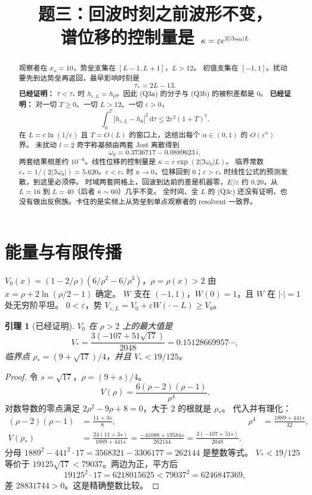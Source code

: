 \documentclass[11pt]{ctexart}
\title{题三：回波时刻之前波形不变，\\
谱位移的控制量是 $\kappa=\eps e^{2|\Im\omega_0|L}$}
\author{}
\date{}
\newtheorem{lemma}[theorem]{引理}
\theoremstyle{definition}
\theoremstyle{remark}
\newcommand{\eps}{\varepsilon}
\newcommand{\rd}{\mathrm{d}}
\begin{document}
\pagestyle{plain}
\maketitle

\begin{abstract}
观察者在 $x_o=10$，势垒支集在 $[L-1,L+1]$，$L>12$。
初值支集在 $[-1,1]$。扰动要先到达势垒再返回，最早影响时刻是
\[
\tau_*=2L-13.
\]
\textbf{已经证明：} $\tau<\tau_*$ 时 $h_{\eps,L}=h_0$。因此 (Q3a) 的分子与 (Q3b) 的被积差都是 $0$。
\textbf{已经证明：} 对一切 $T\ge0$、一切 $L>12$、一切 $\eps>0$，
\[
\int_0^T|h_{\eps,L}-h_0|^2\,\rd\tau\le 2\eps^2(1+T)^7.
\]
在 $L=c\ln(1/\eps)$ 且 $T=O(L)$ 的窗口上，这给出每个 $\alpha\in(0,1)$ 的 $O(\eps^\alpha)$ 界。
未扰动 $l=2$ 奇宇称基频由两套 Jost 离散得到
\[
\omega_0=0.3736717-0.0889623\,i,
\]
两套结果相差约 $10^{-6}$。线性位移的控制量是 $\kappa=\eps\exp(2|\Im\omega_0|L)$。
临界常数 $c_*=1/(2|\Im\omega_0|)=5.620$。$c<c_*$ 时 $\kappa\to0$，位移回到 $0$；$c>c_*$ 时线性公式的预测发散，到这里必须停。
时域两套网格上，回波到达前的差是机器零，$E/\eps$ 约 $0.20$，从 $L=16$ 到 $L=40$（后者 $\kappa\sim60$）几乎不变。
全时间、全 $L$ 的 (Q3c) 还没有证明，也没有做出反例族。卡住的是实频上从势垒到单点观察者的 resolvent 一致界。
\end{abstract}

\section{能量与有限传播}

$V_0(x)=(1-2/\rho)(6/\rho^2-6/\rho^3)$，$\rho=\rho(x)>2$ 由 $x=\rho+2\ln(\rho/2-1)$ 确定。
$W$ 支在 $(-1,1)$，$W(0)=1$，且 $W$ 在 $|\cdot|=1$ 处无穷阶平坦。
$0<\eps$，势 $V_{\eps,L}=V_0+\eps W(\cdot-L)\ge V_0$。

\begin{lemma}[已经证明]
\label{lem:vmax}
$V_0$ 在 $\rho>2$ 上的最大值是
\[
V_*=\frac{3(-107+51\sqrt{17})}{2048}=0.15128669957\cdots,
\]
临界点 $\rho_*=(9+\sqrt{17})/4$，并且 $V_*<19/125$。
\end{lemma}

\begin{proof}
令 $s=\sqrt{17}$，$\rho=(9+s)/4$。
\[
V(\rho)=\frac{6(\rho-2)(\rho-1)}{\rho^4}.
\]
对数导数的零点满足 $2\rho^2-9\rho+8=0$，大于 $2$ 的根就是 $\rho_*$。
代入并有理化：
\begin{align*}
(\rho-2)(\rho-1)&=\frac{11+3s}{8},&
\rho^4&=\frac{1889+441s}{32},\\
V(\rho_*)&=\frac{24(11+3s)}{1889+441s}
=\frac{-41088+19584s}{262144}
=\frac{3(-107+51s)}{2048}.
\end{align*}
分母 $1889^2-441^2\cdot17=3568321-3306177=262144$ 是整数等式。
$V_*<19/125$ 等价于 $19125\sqrt{17}<79037$。两边为正，平方后
\[
19125^2\cdot17=6218015625<79037^2=6246847369,
\]
差 $28831744>0$。这是精确整数比较。
\end{proof}
\end{document}
